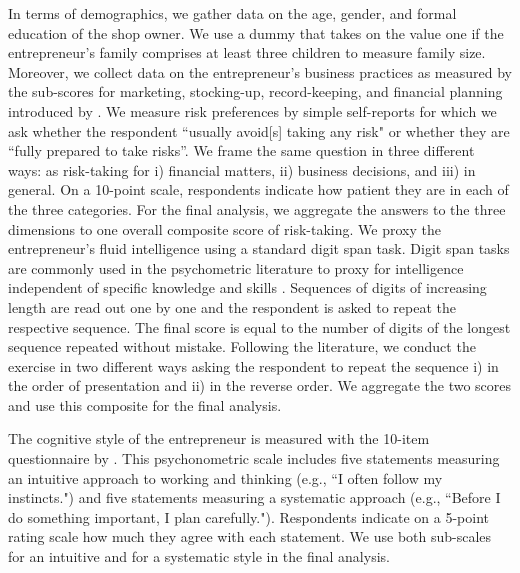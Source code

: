 \documentclass[11.5pt]{article}
\begin{document}
In terms of demographics, we gather data on the age, gender, and formal education of the shop owner. We use a dummy that takes on the value one if the entrepreneur's family comprises at least three children to measure family size. Moreover, we collect data on the entrepreneur's business practices as measured by the sub-scores for marketing, stocking-up, record-keeping, and financial planning introduced by \citet{McKenzie2017}. We measure risk preferences by simple self-reports for which we ask whether the respondent ``usually avoid[s] taking any risk" or whether they are  ``fully prepared to take risks''. We frame the same question in three different ways: as risk-taking for i) financial matters, ii) business decisions, and iii) in general. On a 10-point scale, respondents indicate how patient they are in each of the three categories. For the final analysis, we aggregate the answers to the three dimensions to one overall composite score of risk-taking. We proxy the entrepreneur's fluid intelligence using a standard digit span task. Digit span tasks are commonly used in the psychometric literature to proxy for intelligence independent of specific knowledge and skills \citep[see, e.g.,][]{Engle1999, Hale2002, Colom2005, Kane2005}. Sequences of digits of increasing length are read out one by one and the respondent is asked to repeat the respective sequence. The final score is equal to the number of digits of the longest sequence repeated without mistake. Following the literature, we conduct the exercise in two different ways asking the respondent to repeat the sequence i) in the order of presentation and ii) in the reverse order. We aggregate the two scores and use this composite for the final analysis.

The cognitive style of the entrepreneur is measured with the 10-item questionnaire by \citet{Sagiv2010}. This psychonometric scale includes five statements measuring an intuitive approach to working and thinking (e.g., ``I often follow my instincts.") and five statements measuring a systematic approach (e.g., ``Before I do something important, I plan carefully."). Respondents indicate on a 5-point rating scale how much they agree with each statement. We use both sub-scales for an intuitive and for a systematic style in the final analysis. %

\end{document}
